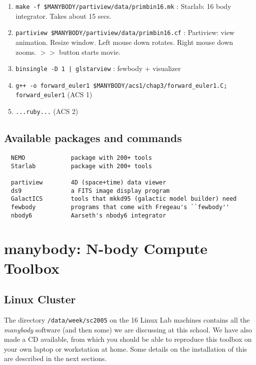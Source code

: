 \begin{enumerate}
\item
{\tt make -f \$MANYBODY/partiview/data/primbin16.mk} : Starlab: 16 body integrator. Takes about 15 secs.

\item
{\tt partiview  \$MANYBODY/partiview/data/primbin16.cf} : Partiview: view animation. Resize window.
Left mouse down rotates. Right mouse down zooms. $>>$ button starts movie.

\item
{\tt binsingle -D 1 | glstarview} : fewbody + visualizer

\item
{\tt g++ -o forward\_euler1 \$MANYBODY/acs1/chap3/forward\_euler1.C; forward\_euler1} 
(ACS 1)

\item
{\tt ...ruby...}
(ACS 2)


\end{enumerate}

\section{Available packages and commands}

\begin{verbatim}
  NEMO             package with 200+ tools
  Starlab          package with 200+ tools

  partiview        4D (space+time) data viewer
  ds9              a FITS image display program
  GalactICS        tools that mkkd95 (galactic model builder) need
  fewbody          programs that come with Fregeau's ``fewbody''
  nbody6           Aarseth's nbody6 integrator
\end{verbatim}


\chapter                {manybody: N-body Compute Toolbox}



\section{Linux Cluster}

The directory {\tt /data/week/sc2005} on the 16 Linux Lab machines
contains all the {\it manybody} software (and then some)  
we are discussing at this school. We have
also made a CD available, from which you should be able to reproduce this
toolbox on your own laptop or workstation at home. 
Some details on the installation of this are described in the next sections.


